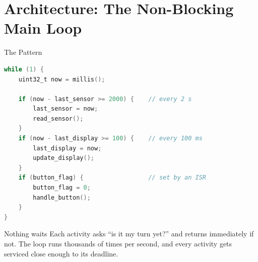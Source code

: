 \documentclass[9pt,aspectratio=169,xcolor=table]{beamer}
\begin{document}
\section{Architecture: The Non-Blocking Main Loop}

\begin{frame}[fragile]{The Pattern}
\begin{lstlisting}[language=C, basicstyle=\ttfamily\scriptsize]
while (1) {
    uint32_t now = millis();

    if (now - last_sensor >= 2000) {    // every 2 s
        last_sensor = now;
        read_sensor();
    }
    if (now - last_display >= 100) {    // every 100 ms
        last_display = now;
        update_display();
    }
    if (button_flag) {                  // set by an ISR
        button_flag = 0;
        handle_button();
    }
}
\end{lstlisting}

    \vspace{2mm}
    \begin{block}{Nothing waits}
        Each activity asks ``is it my turn yet?'' and returns immediately if not.
        The loop runs thousands of times per second, and every activity gets
        serviced \alert{close enough} to its deadline.
    \end{block}
\end{frame}
\end{document}
